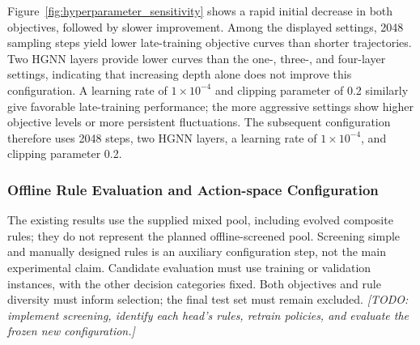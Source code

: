 Figure~\ref{fig:hyperparameter_sensitivity} shows a rapid initial decrease in both objectives,
followed by slower improvement. Among the displayed settings, 2048 sampling steps yield lower
late-training objective curves than shorter trajectories. Two HGNN layers provide lower curves than the one-,
three-, and four-layer settings, indicating that increasing depth alone does not improve this configuration.
A learning rate of $1\times10^{-4}$ and clipping parameter of 0.2 similarly give favorable late-training performance;
the more aggressive settings show higher objective levels or more persistent fluctuations.
The subsequent configuration therefore uses 2048 steps, two HGNN layers, a learning rate of $1\times10^{-4}$,
and clipping parameter 0.2.



\subsubsection{Offline Rule Evaluation and Action-space Configuration}
\label{subsubsec:offline_rule_evaluation}

The existing results use the supplied mixed pool, including evolved composite rules; they do not
represent the planned offline-screened pool. Screening simple and manually designed rules is an
auxiliary configuration step, not the main experimental claim. Candidate evaluation must use training
or validation instances, with the other decision categories fixed. Both objectives and rule diversity
must inform selection; the final test set must remain excluded.
\textit{[TODO: implement screening, identify each head's rules, retrain policies, and evaluate the frozen new configuration.]}

